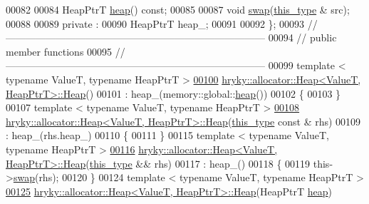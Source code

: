 \begin{DoxyCode}
00082 
00084     HeapPtrT \hyperlink{classhryky_1_1allocator_1_1_heap_a8e298fe26a676998b9bc5178c79961dc}{heap}() \textcolor{keyword}{const};
00085 
00087     \textcolor{keywordtype}{void} \hyperlink{classhryky_1_1allocator_1_1_heap_a855528bfa428ad5289cbdff073311d68}{swap}(\hyperlink{classhryky_1_1allocator_1_1_base}{this_type} & src);
00088 
00089 \textcolor{keyword}{private} :
00090     HeapPtrT    heap\_;
00091 
00092 \};
00093 \textcolor{comment}{//
      ------------------------------------------------------------------------------}
00094 \textcolor{comment}{// public member functions}
00095 \textcolor{comment}{//
      ------------------------------------------------------------------------------}
00099 \textcolor{comment}{}\textcolor{keyword}{template} < \textcolor{keyword}{typename} ValueT, \textcolor{keyword}{typename} HeapPtrT >
\hypertarget{allocator__heap_8h_source_l00100}{}\hyperlink{classhryky_1_1allocator_1_1_heap_a6a7972f4ac65c5c1ad631cb0d4db6590}{00100} \hyperlink{classhryky_1_1allocator_1_1_heap_a6a7972f4ac65c5c1ad631cb0d4db6590}{hryky::allocator::Heap<ValueT, HeapPtrT>::Heap}()
00101     : heap\_(memory::global::\hyperlink{namespacehryky_1_1memory_1_1global_a6fc6103f67c837aa0f39b359588409cd}{heap}())
00102 \{
00103 \}
00107 \textcolor{keyword}{template} < \textcolor{keyword}{typename} ValueT, \textcolor{keyword}{typename} HeapPtrT >
\hypertarget{allocator__heap_8h_source_l00108}{}\hyperlink{classhryky_1_1allocator_1_1_heap_a8e73ccf19f000b54365cbaf614d2c00d}{00108} \hyperlink{classhryky_1_1allocator_1_1_heap}{hryky::allocator::Heap<ValueT, HeapPtrT>::Heap}(\hyperlink{classhryky_1_1allocator_1_1_base}{this_type} \textcolor{keyword}{const} & rhs)
00109     : heap\_(rhs.heap\_)
00110 \{
00111 \}
00115 \textcolor{keyword}{template} < \textcolor{keyword}{typename} ValueT, \textcolor{keyword}{typename} HeapPtrT >
\hypertarget{allocator__heap_8h_source_l00116}{}\hyperlink{classhryky_1_1allocator_1_1_heap_a053e81bcd62ee93ba4e9650c55217f29}{00116} \hyperlink{classhryky_1_1allocator_1_1_heap}{hryky::allocator::Heap<ValueT, HeapPtrT>::Heap}(\hyperlink{classhryky_1_1allocator_1_1_base}{this_type} && rhs)
00117     : heap\_()
00118 \{
00119     this->\hyperlink{classhryky_1_1allocator_1_1_heap_a855528bfa428ad5289cbdff073311d68}{swap}(rhs);
00120 \}
00124 \textcolor{keyword}{template} < \textcolor{keyword}{typename} ValueT, \textcolor{keyword}{typename} HeapPtrT >
\hypertarget{allocator__heap_8h_source_l00125}{}\hyperlink{classhryky_1_1allocator_1_1_heap_ace223f3243a7e5a396cf7b86f5dcfd0f}{00125} \hyperlink{classhryky_1_1allocator_1_1_heap}{hryky::allocator::Heap<ValueT, HeapPtrT>::Heap}(HeapPtrT \hyperlink{namespacehryky_1_1memory_1_1global_a6fc6103f67c837aa0f39b359588409cd}{heap})

\end{DoxyCode}
